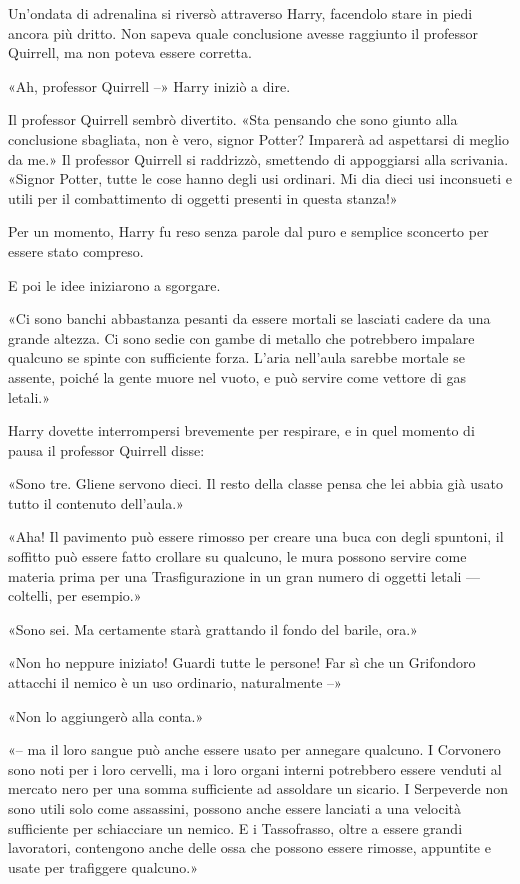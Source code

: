 Un’ondata di adrenalina si riversò attraverso Harry, facendolo stare in piedi ancora più dritto. Non sapeva quale conclusione avesse raggiunto il professor Quirrell, ma non poteva essere corretta.

«Ah, professor Quirrell –» Harry iniziò a dire.

Il professor Quirrell sembrò divertito. «Sta pensando che sono giunto alla conclusione sbagliata, non è vero, signor Potter? Imparerà ad aspettarsi di meglio da me.» Il professor Quirrell si raddrizzò, smettendo di appoggiarsi alla scrivania. «Signor Potter, tutte le cose hanno degli usi ordinari. Mi dia dieci usi inconsueti e utili per il combattimento di oggetti presenti in questa stanza!»

Per un momento, Harry fu reso senza parole dal puro e semplice sconcerto per essere stato compreso.

E poi le idee iniziarono a sgorgare.

«Ci sono banchi abbastanza pesanti da essere mortali se lasciati cadere da una grande altezza. Ci sono sedie con gambe di metallo che potrebbero impalare qualcuno se spinte con sufficiente forza. L’aria nell’aula sarebbe mortale se assente, poiché la gente muore nel vuoto, e può servire come vettore di gas letali.»

Harry dovette interrompersi brevemente per respirare, e in quel momento di pausa il professor Quirrell disse:

«Sono tre. Gliene servono dieci. Il resto della classe pensa che lei abbia già usato tutto il contenuto dell’aula.»

«Aha! Il pavimento può essere rimosso per creare una buca con degli spuntoni, il soffitto può essere fatto crollare su qualcuno, le mura possono servire come materia prima per una Trasfigurazione in un gran numero di oggetti letali — coltelli, per esempio.»

«Sono sei. Ma certamente starà grattando il fondo del barile, ora.»

«Non ho neppure iniziato! Guardi tutte le persone! Far sì che un Grifondoro attacchi il nemico è un uso ordinario, naturalmente –»

«Non lo aggiungerò alla conta.»

«– ma il loro sangue può anche essere usato per annegare qualcuno. I Corvonero sono noti per i loro cervelli, ma i loro organi interni potrebbero essere venduti al mercato nero per una somma sufficiente ad assoldare un sicario. I Serpeverde non sono utili solo come assassini, possono anche essere lanciati a una velocità sufficiente per schiacciare un nemico. E i Tassofrasso, oltre a essere grandi lavoratori, contengono anche delle ossa che possono essere rimosse, appuntite e usate per trafiggere qualcuno.»

